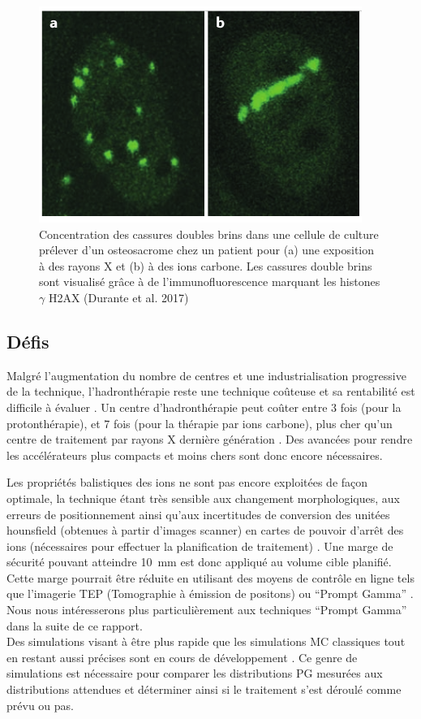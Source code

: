 \documentclass[11pt,a4paper,oldfontcommands]{memoir}
\begin{document}
\begin{figure}
    \centering
    \includegraphics[scale = 0.7]{intro/LETDSS.png}
    \caption{Concentration des cassures doubles brins dans une cellule de culture prélever d'un osteosacrome chez un patient pour (a) une exposition à des rayons X et (b) à des ions carbone. Les cassures double brins sont visualisé grâce à de l'immunofluorescence marquant les histones $ \gamma$ H2AX (Durante et al. 2017)}
    \label{LET}
\end{figure}

\subsection{Défis}
Malgré l'augmentation du nombre de centres et une industrialisation progressive de la technique, l'hadronthérapie reste une technique coûteuse et sa rentabilité est difficile à évaluer \cite{LIEVENS2013134}. Un centre d'hadronthérapie peut coûter entre 3 fois (pour la protonthérapie), et 7 fois (pour la thérapie par ions carbone), plus cher qu'un centre de traitement par rayons X dernière génération \cite{Nupecc}. Des avancées pour rendre les accélérateurs plus compacts et moins chers sont donc encore nécessaires.


Les propriétés balistiques des ions ne sont pas encore exploitées de façon optimale, la technique étant très sensible aux changement morphologiques, aux erreurs de positionnement ainsi qu'aux incertitudes de conversion des unitées hounsfield (obtenues à partir d'images scanner) en cartes de pouvoir d'arrêt des ions (nécessaires pour effectuer la planification de traitement) \cite{Paganetti2012}. Une marge de sécurité pouvant atteindre 10~mm est donc appliqué au volume cible planifié. Cette marge pourrait être réduite en utilisant des moyens de contrôle en ligne tels que l'imagerie TEP (Tomographie à émission de positons) \cite{Parodi2018} ou \enquote{Prompt Gamma} \cite{Krimmer2017a}. Nous nous intéresserons plus particulièrement aux techniques \enquote{Prompt Gamma} dans la suite de ce rapport. \\
Des simulations visant à être plus rapide que les simulations MC classiques tout en restant aussi précises sont en cours de développement \cite{Huisman_2016}\cite{Embriaco_2018}\cite{Sterpin_2015}. Ce genre de simulations est nécessaire pour comparer les distributions PG mesurées aux distributions attendues et déterminer ainsi si le traitement s'est déroulé comme prévu ou pas.
\end{document}
